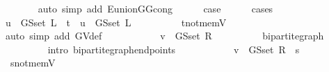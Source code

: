 \begin{isabellebody}
\ \ \ \ \ \ \isamarkupfalse%
\ {\isacharparenleft}{\kern0pt}auto\ simp\ add{\isacharcolon}{\kern0pt}\ E{\isacharunderscore}{\kern0pt}union{\isacharunderscore}{\kern0pt}G{}{\isacharunderscore}{\kern0pt}G{}{\isacharunderscore}{\kern0pt}cong{\isacharparenright}{\kern0pt}\isanewline
\ \ \ \ \isamarkupfalse%
\ {\isacharquery}{\kern0pt}case\isanewline
\ \ \ \ \isamarkupfalse%
\ {\isacharparenleft}{\kern0pt}cases{\isacharparenright}{\kern0pt}\isanewline
\ \ \ \ \ \ \isamarkupfalse%
\ {}\isanewline
\ \ \ \ \ \ \isamarkupfalse%
\ {\isachardoublequoteopen}u\ {\isasymin}\ G{\isachardot}{\kern0pt}S{\isachardot}{\kern0pt}set\ L\ {\isasymunion}\ {\isacharbraceleft}{\kern0pt}t{\isacharbraceright}{\kern0pt}\ {\isasymlongleftrightarrow}\ u\ {\isasymin}\ G{\isachardot}{\kern0pt}S{\isachardot}{\kern0pt}set\ L{\isachardoublequoteclose}\isanewline
\ \ \ \ \ \ \ \ \isamarkupfalse%
\ t{\isacharunderscore}{\kern0pt}not{\isacharunderscore}{\kern0pt}mem{\isacharunderscore}{\kern0pt}V\isanewline
\ \ \ \ \ \ \ \ \isamarkupfalse%
\ {\isacharparenleft}{\kern0pt}auto\ simp\ add{\isacharcolon}{\kern0pt}\ G{\isachardot}{\kern0pt}V{\isacharunderscore}{\kern0pt}def{\isacharparenright}{\kern0pt}\isanewline
\ \ \ \ \ \ \isamarkupfalse%
\ \isamarkupfalse%
\ {\isachardoublequoteopen}{\isachardot}{\kern0pt}{\isachardot}{\kern0pt}{\isachardot}{\kern0pt}\ {\isasymlongleftrightarrow}\ v\ {\isasymin}\ G{\isachardot}{\kern0pt}S{\isachardot}{\kern0pt}set\ R{\isachardoublequoteclose}\isanewline
\ \ \ \ \ \ \ \ \isamarkupfalse%
\ bipartite{\isacharunderscore}{\kern0pt}graph\ {}\isanewline
\ \ \ \ \ \ \ \ \isamarkupfalse%
\ {\isacharparenleft}{\kern0pt}intro\ bipartite{\isacharunderscore}{\kern0pt}graph{\isachardot}{\kern0pt}endpoints{\isacharparenright}{\kern0pt}\isanewline
\ \ \ \ \ \ \isamarkupfalse%
\ \isamarkupfalse%
\ {\isachardoublequoteopen}{\isachardot}{\kern0pt}{\isachardot}{\kern0pt}{\isachardot}{\kern0pt}\ {\isasymlongleftrightarrow}\ v\ {\isasymin}\ G{\isachardot}{\kern0pt}S{\isachardot}{\kern0pt}set\ R\ {\isasymunion}\ {\isacharbraceleft}{\kern0pt}s{\isacharbraceright}{\kern0pt}{\isachardoublequoteclose}\isanewline
\ \ \ \ \ \ \ \ \isamarkupfalse%
\ {}\ s{\isacharunderscore}{\kern0pt}not{\isacharunderscore}{\kern0pt}mem{\isacharunderscore}{\kern0pt}V\isanewline
\ \ \ \ \ \ \ \ \isamarkupfalse%

\end{isabellebody}
